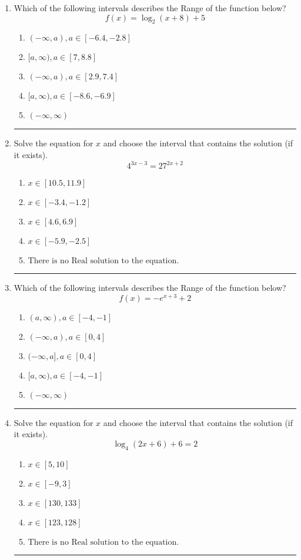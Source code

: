 \documentclass[14pt]{extbook}
\newcommand{\litem}[1]{\item#1\hspace*{-1cm}\rule{\textwidth}{0.4pt}}
\begin{document}
\begin{enumerate}
\litem{
Which of the following intervals describes the Range of the function below?\[ f(x) = \log_2{(x+8)}+5 \]\begin{enumerate}[label=\Alph*.]
\item \( (-\infty, a), a \in [-6.4, -2.8] \)
\item \( [a, \infty), a \in [7, 8.8] \)
\item \( (-\infty, a), a \in [2.9, 7.4] \)
\item \( [a, \infty), a \in [-8.6, -6.9] \)
\item \( (-\infty, \infty) \)

\end{enumerate} }
\litem{
Solve the equation for $x$ and choose the interval that contains the solution (if it exists).\[ 4^{3x-3} = 27^{2x+2} \]\begin{enumerate}[label=\Alph*.]
\item \( x \in [10.5, 11.9] \)
\item \( x \in [-3.4, -1.2] \)
\item \( x \in [4.6, 6.9] \)
\item \( x \in [-5.9, -2.5] \)
\item \( \text{There is no Real solution to the equation.} \)

\end{enumerate} }
\litem{
Which of the following intervals describes the Range of the function below?\[ f(x) = -e^{x+3}+2 \]\begin{enumerate}[label=\Alph*.]
\item \( (a, \infty), a \in [-4, -1] \)
\item \( (-\infty, a), a \in [0, 4] \)
\item \( (-\infty, a], a \in [0, 4] \)
\item \( [a, \infty), a \in [-4, -1] \)
\item \( (-\infty, \infty) \)

\end{enumerate} }
\litem{
Solve the equation for $x$ and choose the interval that contains the solution (if it exists).\[ \log_{4}{(2x+6)}+6 = 2 \]\begin{enumerate}[label=\Alph*.]
\item \( x \in [5, 10] \)
\item \( x \in [-9, 3] \)
\item \( x \in [130, 133] \)
\item \( x \in [123, 128] \)
\item \( \text{There is no Real solution to the equation.} \)


\end{enumerate}}
\end{enumerate}
\end{document}
